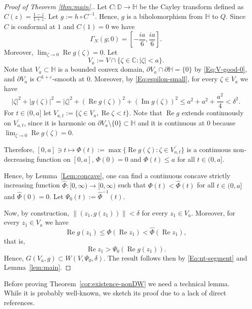 \documentclass[12pt]{amsart}
\theoremstyle{definition}
\theoremstyle{remark}
\numberwithin{equation}{section}
\def\C{\mathbb C}
\def\D{\mathbb D}
\def\Ha{\mathbb H}
\renewcommand{\Re}{\operatorname{Re}}
\renewcommand{\Im}{\operatorname{Im}}
\begin{document}
\begin{proof}[Proof of Theorem \ref{thm:main}.]
Let $C:\D\to \Ha$ be the Cayley transform defined as $C(z)=\frac{1-z}{1+z}$. Let $g:=h\circ C^{-1}$. Hence, $g$ is a biholomorphism from $\Ha$ to $Q$. Since $C$ is conformal at $1$ and $C(1)=0$ we have
\begin{equation}\label{Eq:nt-segment}
\Gamma_N(g;0)=[-\frac{ia}{6},\frac{ia}{6}].
\end{equation}
Moreover, $\lim_{\zeta\to 0}\Re g(\zeta)=0$.
Let 
\[
V_a:=V\cap \{\zeta\in \C: |\zeta|<a\}.
\]
{Note that} $V_a\subset\Ha$ is a bounded convex domain, { $\partial V_a\cap \partial \Ha=\{0\}$ by \eqref{Eq:V-good-0}}, and $\partial V_a$ is $C^{1+\varepsilon}$-smooth at $0$. Moreover, by \eqref{Eq:espilon-small}, for every $\zeta\in V_a$ we have
\[
|\zeta|^2+|g(\zeta)|^2=|\zeta|^2+(\Re g(\zeta))^2+(\Im g(\zeta))^2\leq a^2+a^2+\frac{a^2}{4}<\delta^2.
\]
{ For $t\in (0,a]$ let $V_{a,t}:=\{\zeta\in V_a, \Re \zeta < t \}$. Note that $\Re g$  extends continuously on $\overline{V_{a,t}}$, since it is harmonic on $\partial V_a\setminus\{0\}\subset\Ha$ and it is continuous at $0$ because $\lim_{\zeta\to 0}\Re g(\zeta)=0$.}

{ Therefore, $[0,a]\ni t\mapsto \Phi(t):= \max\{\Re g(\zeta): \zeta\in \overline{V_{a,t}}\}$ is  a continuous non-decreasing function on $[0,a]$, $\Phi(0)=0$ and $\Phi(t)\leq a$ for all $t\in (0,a]$}. 


{ Hence, by Lemma~\ref{Lem:concave},} one can find a continuous concave strictly increasing function  $\hat \Phi:[0,\infty) \to [0,\infty)$ such that $\Phi(t)< \hat \Phi(t)$ for all {$t\in(0,a]$} and $\hat \Phi(0)=0$.  Let $\Psi_0(t):=\hat \Phi^{-1}(t)$. 

Now, by construction, $\|(z_1, g(z_1))\|<\delta$ for every $z_1\in V_a$. Moreover, for every $z_1\in V_a$ we have
\[
\Re g(z_1)\leq \Phi(\Re z_1)< \hat \Phi(\Re z_1),
\]
that is,
\begin{equation}\label{Eq:stay-below-g}
\Re z_1 > \Psi_0(\Re g(z_1)).
\end{equation}
Hence, $G(V_a,g)\subset W(V,\Psi_0,\delta)$. The result follows then by \eqref{Eq:nt-segment} and Lemma~\ref{lem:main}.
\end{proof}

{Before proving Theorem~\ref{cor:existence-nonDW} we need a technical lemma.  While it is probably well-known, we sketch its proof due to a lack of direct references}.
\end{document}
